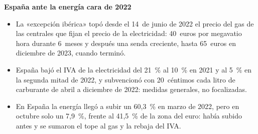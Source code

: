 \documentclass[11pt]{article}
\begin{document}
\begin{anotaciones}
\textbf{España ante la energía cara de 2022}
\begin{itemize}
\item La «excepción ibérica» topó desde el 14~de junio de 2022 el precio del gas de las centrales que fijan el precio de la electricidad: 40~euros por megavatio hora durante 6~meses y después una senda creciente, hasta 65~euros en diciembre de 2023, cuando terminó\nocite{BOE2022RDL10,BOE2022OrdenTED517,BOE2023RDL3,CE2022AyudaIberica}.
\item España bajó el IVA de la electricidad del 21~\% al 10~\% en 2021 y al 5~\% en la segunda mitad de 2022\nocite{BOE2021RDL12,BOE2022RDL11}, y subvencionó con 20~céntimos cada litro de carburante de abril a diciembre de 2022\nocite{BOE2022RDL6,BOE2022RDL11}: medidas generales, no focalizadas.
\item En España la energía llegó a subir un 60,3~\% en marzo de 2022, pero en octubre solo un 7,9~\%, frente al 41,5~\% de la zona del euro\nocite{Eurostat2026IAPC}: había subido antes y se sumaron el tope al gas y la rebaja del IVA.
\end{itemize}
\end{anotaciones}
\end{document}
